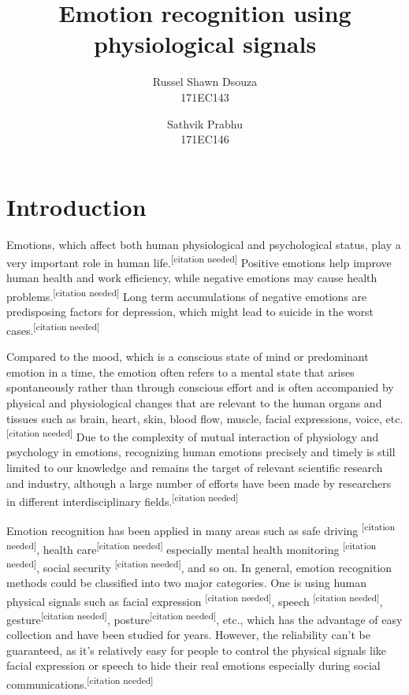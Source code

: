 \documentclass[11pt]{article}
\title{\textbf{Emotion recognition using physiological signals}}
\author{
  Russel Shawn Dsouza\\
  171EC143
  \and
  Sathvik Prabhu\\
  171EC146
}
\date{}
\theoremstyle{definition}
\begin{document}
  \maketitle

  \section{Introduction}
    Emotions, which affect both human physiological and psychological status, play a very important role in human life.\textsuperscript{[citation needed]}
    Positive emotions help improve human health and work efficiency, while negative emotions may cause health problems.\textsuperscript{[citation needed]}
    Long term accumulations of negative emotions are predisposing factors for depression, which might lead to suicide in the worst cases.\textsuperscript{[citation needed]}

    Compared to the mood, which is a conscious state of mind or predominant emotion in a time, the emotion often refers to a mental state that arises spontaneously rather than through conscious effort and is often accompanied by physical and physiological changes that are relevant to the human organs and tissues such as brain, heart, skin, blood flow, muscle, facial expressions, voice, etc.\textsuperscript{[citation needed]}
    Due to the complexity of mutual interaction of physiology and psychology in emotions, recognizing human emotions precisely and timely is still limited to our knowledge and remains the target of relevant scientific research and industry, although a large number of efforts have been made by researchers in different interdisciplinary fields.\textsuperscript{[citation needed]}

    Emotion recognition has been applied in many areas such as safe driving \textsuperscript{[citation needed]}, health care\textsuperscript{[citation needed]} especially mental health monitoring \textsuperscript{[citation needed]}, social security \textsuperscript{[citation needed]}, and so on. 
    In general, emotion recognition methods could be classified into two major categories. 
    One is using human physical signals such as facial expression \textsuperscript{[citation needed]}, speech \textsuperscript{[citation needed]}, gesture\textsuperscript{[citation needed]}, posture\textsuperscript{[citation needed]}, etc., which has the advantage of easy collection and have been studied for years. 
    However, the reliability can’t be guaranteed, as it’s relatively easy for people to control the physical signals like facial expression or speech to hide their real emotions especially during social communications.\textsuperscript{[citation needed]}
\end{document}
